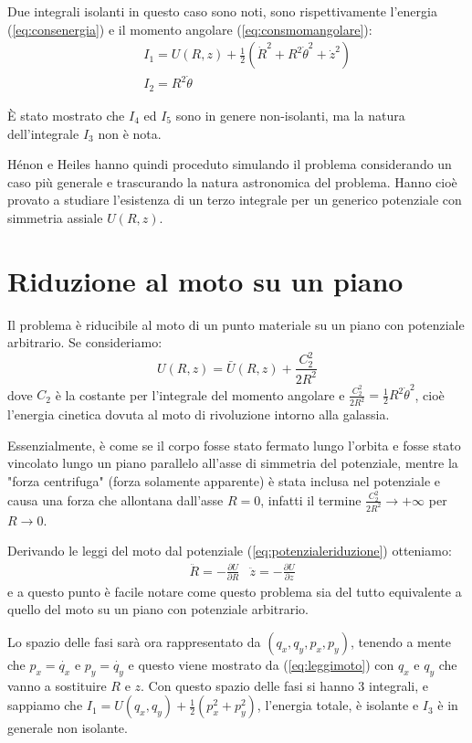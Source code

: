\documentclass[a4paper, 12pt]{article}
\numberwithin{equation}{section}
\numberwithin{figure}{section}
\begin{document}
Due integrali isolanti in questo caso sono noti, sono rispettivamente l'energia (\ref{eq:consenergia})
e il momento angolare (\ref{eq:consmomangolare}):
\begin{eqnarray}
	&&I_1 = U(R,z) + \frac{1}{2}(\dot{R}^2+R^2\dot{\theta}^2+\dot{z}^2) \label{eq:consenergia}\\
	&&I_2 = R^2\dot{\theta} \label{eq:consmomangolare}
\end{eqnarray}

È stato mostrato che $I_4$ ed $I_5$ sono in genere non-isolanti, ma la natura dell'integrale
$I_3$ non è nota.

Hénon e Heiles hanno quindi proceduto simulando il problema considerando un caso più generale
e trascurando la natura astronomica del problema. Hanno cioè provato a studiare l'esistenza
di un terzo integrale per un generico potenziale con simmetria assiale $U(R,z)$.

\clearpage

\section{Riduzione al moto su un piano}
Il problema è riducibile al moto di un punto materiale su un piano con potenziale arbitrario.
Se consideriamo:
\begin{equation}
	U(R,z) = \bar{U}(R,z) + \frac{C_2^2}{2R^2} \label{eq:potenzialeriduzione}
\end{equation}
dove $C_2$ è la costante per l'integrale del momento angolare
e $\frac{C_2^2}{2R^2} = \frac{1}{2}R^2\dot{\theta}^2$, cioè l'energia
cinetica dovuta al moto di rivoluzione intorno alla galassia.

Essenzialmente, è come se il corpo fosse stato fermato lungo l'orbita e fosse stato vincolato lungo un piano
parallelo all'asse di simmetria del potenziale, mentre la "forza centrifuga" (forza solamente apparente)
è stata inclusa nel potenziale e causa una forza che allontana dall'asse $R=0$, infatti il termine
$\frac{C_2^2}{2R^2}\to +\infty$  per $R\to0$.

Derivando le leggi del moto dal potenziale (\ref{eq:potenzialeriduzione}) otteniamo:
\begin{align}
	&\ddot{R} = -\frac{\partial U}{\partial R}&
	\ddot{z} = -\frac{\partial U}{\partial z}
\end{align}
e a questo punto è facile notare come questo problema sia del tutto equivalente a quello del moto su un piano
con potenziale arbitrario.

Lo spazio delle fasi sarà ora rappresentato da $(q_x,q_y,p_x,p_y)$, tenendo a mente che $p_x = \dot{q_x}$
e $p_y = \dot{q_y}$ e questo viene mostrato da (\ref{eq:leggimoto})
con $q_x$ e $q_y$ che vanno a sostituire $R$ e $z$. Con questo spazio delle fasi si hanno 3 integrali,
e sappiamo che $I_1 = U(q_x,q_y)+\frac{1}{2}(p_x^2+p_y^2)$, l'energia totale, è isolante e $I_3$ è
in generale non isolante.
\end{document}
